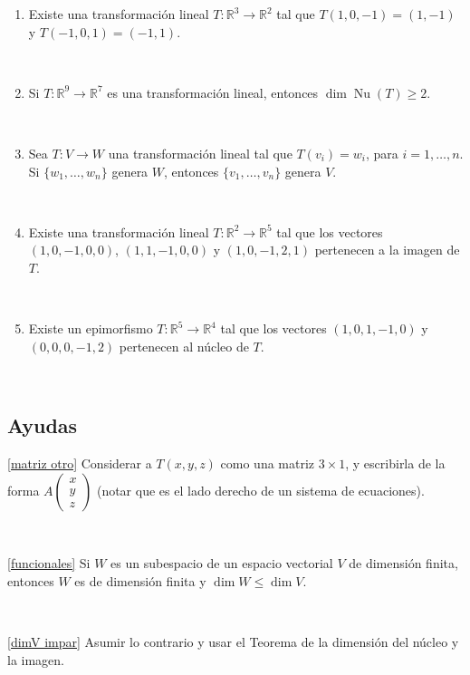 \documentclass[12pt]{amsart}
\begin{document}
\begin{enumerate}[resume, topsep=5pt,itemsep=5pt]
\begin{enumerate}
\

\item Existe una transformaci\' on lineal $T : \mathbb R^3 \to \mathbb R^2$ tal que $T(1, 0,-1) = (1, -1)$ y $T(-1, 0, 1) = (-1, 1)$.

\

\item  Si $T : \mathbb R^9 \to \mathbb R^7$ es una transformaci\' on lineal, entonces $\dim \operatorname{Nu}(T) \geq  2$.

\

\item Sea $T : V \to W$ una transformaci\' on lineal tal que $T(v_i) = w_i$, para $i = 1, \dots , n$. Si $\{w_1, \dots , w_n\}$ genera $W$, entonces
$\{v_1, \dots , v_n\}$ genera $V$.

\

\item Existe una transformaci\' on lineal $T : \mathbb R^2 \to \mathbb R^5$ tal que los vectores $(1, 0, -1, 0, 0)$, $(1, 1, -1, 0, 0)$ y 
$(1, 0, -1, 2, 1)$ pertenecen a la imagen de $T$.

\

\item Existe un epimorfismo $T : \mathbb R^5 \to \mathbb R^4$ tal que los vectores $(1, 0, 1, -1, 0)$ y $(0, 0, 0, -1, 2)$
pertenecen al n\' ucleo de $T$.
\end{enumerate}

\end{enumerate}

\

\subsection*{Ayudas}

\eqref{matriz otro} Considerar a $T(x,y,z)$ como una matriz $3\times 1$, y escribirla de la forma $A\left(\begin{matrix}
	x\\y\\z \end{matrix}\right)$ (notar que es el lado derecho de un sistema de ecuaciones).

\

\eqref{funcionales} Si $W$ es un subespacio de un espacio vectorial $V$ de dimensión
finita, entonces $W$ es de dimensión finita y $\operatorname{dim} W \leq \operatorname{dim} V$.

\

\eqref{dimV impar} Asumir lo contrario y usar el Teorema de la dimensi\'on del n\'ucleo y la imagen.





\end{document}

